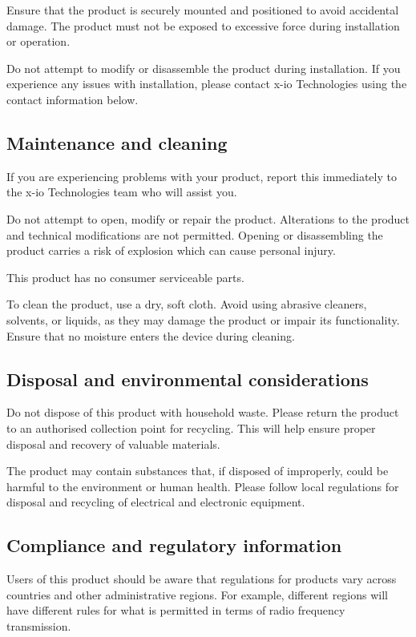 Ensure that the product is securely mounted and positioned to avoid accidental damage. The product must not be exposed to excessive force during installation or operation.

Do not attempt to modify or disassemble the product during installation. If you experience any issues with installation, please contact x-io Technologies using the contact information below.

\subsection{Maintenance and cleaning}

If you are experiencing problems with your product, report this immediately to the x-io Technologies team who will assist you.

Do not attempt to open, modify or repair the product. Alterations to the product and technical modifications are not permitted. Opening or disassembling the product carries a risk of explosion which can cause personal injury.

This product has no consumer serviceable parts.

To clean the product, use a dry, soft cloth. Avoid using abrasive cleaners, solvents, or liquids, as they may damage the product or impair its functionality. Ensure that no moisture enters the device during cleaning.

\subsection{Disposal and environmental considerations}

Do not dispose of this product with household waste. Please return the product to an authorised collection point for recycling. This will help ensure proper disposal and recovery of valuable materials.

The product may contain substances that, if disposed of improperly, could be harmful to the environment or human health. Please follow local regulations for disposal and recycling of electrical and electronic equipment.

\subsection{Compliance and regulatory information}

Users of this product should be aware that regulations for products vary across countries and other administrative regions. For example, different regions will have different rules for what is permitted in terms of radio frequency transmission.

